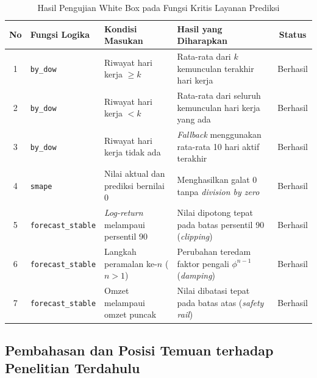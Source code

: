\documentclass[10pt,a4paper]{article}
\begin{document}
\begin{table}[H]
  \centering
  \caption{Hasil Pengujian White Box pada Fungsi Kritis Layanan Prediksi}
  \label{tab:whitebox}
  \fontsize{9pt}{11pt}\selectfont
  \begin{tabularx}{\textwidth}{cllXc}
    \toprule
    \textbf{No} & \textbf{Fungsi Logika} & \textbf{Kondisi Masukan} & \textbf{Hasil yang Diharapkan} & \textbf{Status} \\
    \midrule
    1 & \texttt{by\_dow} & Riwayat hari kerja $\ge k$ & Rata-rata dari $k$ kemunculan terakhir hari kerja & Berhasil \\
    2 & \texttt{by\_dow} & Riwayat hari kerja $< k$ & Rata-rata dari seluruh kemunculan hari kerja yang ada & Berhasil \\
    3 & \texttt{by\_dow} & Riwayat hari kerja tidak ada & \textit{Fallback} menggunakan rata-rata 10 hari aktif terakhir & Berhasil \\
    4 & \texttt{smape} & Nilai aktual dan prediksi bernilai 0 & Menghasilkan galat 0 tanpa \textit{division by zero} & Berhasil \\
    5 & \texttt{forecast\_stable} & \textit{Log-return} melampaui persentil 90 & Nilai dipotong tepat pada batas persentil 90 (\textit{clipping}) & Berhasil \\
    6 & \texttt{forecast\_stable} & Langkah peramalan ke-$n$ ($n>1$) & Perubahan teredam faktor pengali $\phi^{n-1}$ (\textit{damping}) & Berhasil \\
    7 & \texttt{forecast\_stable} & Omzet melampaui omzet puncak & Nilai dibatasi tepat pada batas atas (\textit{safety rail}) & Berhasil \\
    \bottomrule
  \end{tabularx}
\end{table}

\subsection{Pembahasan dan Posisi Temuan terhadap Penelitian Terdahulu}
\end{document}

